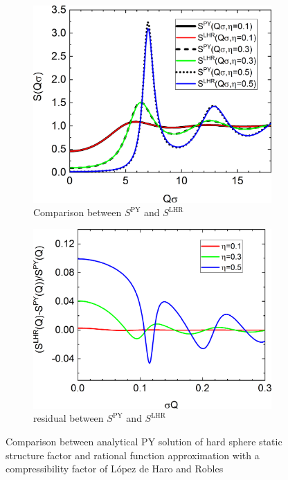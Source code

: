 \begin{figure}[htb]
\begin{subfigure}[b]{.48\textwidth}
   \centering
   \includegraphics[width=1\textwidth]{../images/structure_factor/HardSphere/SQLHR.png}
   \caption{Comparison between $S^\mathrm{PY}$ and $S^\mathrm{LHR}$}
   \label{fig:SQ:LHR_1}
\end{subfigure}
\hfill
\begin{subfigure}[b]{.48\textwidth}
   \centering
   \includegraphics[width=1\textwidth]{../images/structure_factor/HardSphere/ResLHR.png}
   \caption{residual between $S^\mathrm{PY}$ and $S^\mathrm{LHR}$}
   \label{fig:SQ:LHR_2}
\end{subfigure}
\caption{Comparison between analytical PY solution of hard sphere static structure factor and rational function approximation with a compressibility factor of L\'{o}pez de Haro and Robles}
\label{fig:SQ:LHR}
\end{figure}


